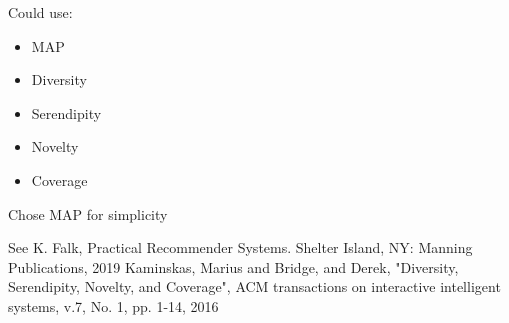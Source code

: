 
    Could use:
    \begin{itemize}
        \item MAP
        \item Diversity
        \item Serendipity
        \item Novelty
        \item Coverage
    \end{itemize}

    \vspace{2ex}

    Chose MAP for simplicity

    \vspace{2ex}

    \tiny See
    K. Falk, Practical Recommender Systems. Shelter Island, NY: Manning Publications, 2019
    \vspace{1ex}
    Kaminskas, Marius and Bridge, and Derek, "Diversity, Serendipity, Novelty, and Coverage", ACM transactions on interactive intelligent systems, v.7, No. 1, pp. 1-14, 2016
